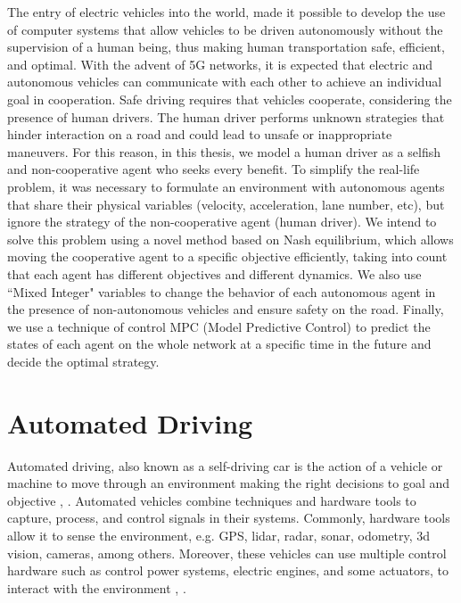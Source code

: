 The entry of electric vehicles into the world, made it possible to develop the use of computer systems that allow vehicles to be driven autonomously without the supervision of a human being, thus making human transportation safe, efficient, and optimal. With the advent of 5G networks, it is expected that electric and autonomous vehicles can communicate with each other to achieve an individual goal in cooperation. Safe driving requires that vehicles cooperate,  considering the presence of human drivers. The human driver performs unknown strategies that hinder interaction on a road and could lead to unsafe or inappropriate maneuvers. For this reason, in this thesis, we model a human driver as a selfish and non-cooperative agent who seeks every benefit. To simplify the real-life problem, it was necessary to formulate an environment with autonomous agents that share their physical variables (velocity, acceleration, lane number, etc), but ignore the strategy of the non-cooperative agent (human driver). We intend to solve this problem using a novel method based on Nash equilibrium, which allows moving the cooperative agent to a specific objective efficiently, taking into count that each agent has different objectives and different dynamics. We also use ``Mixed Integer" variables to change the behavior of each autonomous agent in the presence of non-autonomous vehicles and ensure safety on the road. Finally, we use a technique of control MPC (Model Predictive Control) to predict the states of each agent on the whole network at a specific time in the future and decide the optimal strategy.

\section{Automated Driving}

Automated driving, also known as a self-driving car is the action of a vehicle or machine to move through an environment making the right decisions to goal and objective \cite{Taeihagh_2018}, \cite{Thrun2010TowardRC}.  Automated vehicles combine techniques and hardware tools to capture, process, and control signals in their systems. Commonly, hardware tools allow it to sense the environment, e.g. GPS, lidar, radar, sonar, odometry, 3d vision, cameras, among others. Moreover, these vehicles can use multiple control hardware such as control power systems, electric engines, and some actuators, to interact with the environment \cite{8957499}, \cite{811692}.

